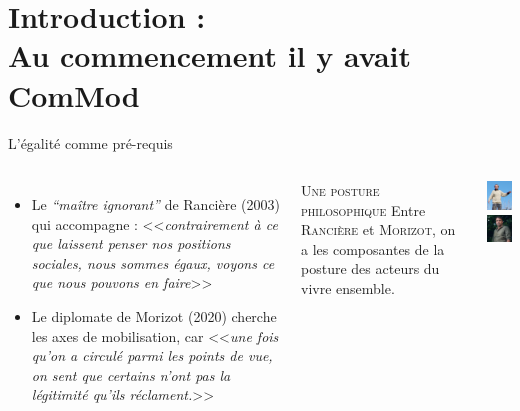 \documentclass[newPxFont]{beamer}
\begin{document}
\section{Introduction :\\ Au commencement il y avait ComMod}
  \begin{frame}[c]{L'égalité comme pré-requis}
    \vspace{-1cm}
    \begin{columns}[onlytextwidth,T]
      \column{\dimexpr\linewidth-30mm-5mm}
          \begin{itemize}
            \item Le \textit{``maître ignorant''} de Rancière (2003) qui accompagne : <<\emph{contrairement à ce que laissent penser nos positions sociales, nous sommes égaux, voyons ce que nous pouvons en faire}>>
            \item Le diplomate de Morizot (2020) cherche les axes de mobilisation, car <<\emph{une fois qu’on a circulé parmi les points de vue, on sent que certains n’ont pas la légitimité qu’ils réclament.}>>
          \end{itemize}

          \small{
              \begin{alertblock}{\textsc{Une posture philosophique}}
                Entre \textsc{Rancière} et \textsc{Morizot}, on a les composantes de la posture des acteurs du vivre ensemble.
              \end{alertblock}
            }
      \column{30mm}
      \vspace{0.5cm}
            \includegraphics[width=3cm]{img/Ranciere.jpg}\\
            \includegraphics[width=3cm]{img/morizot.jpg}
    \end{columns}
  \end{frame}
\end{document}
